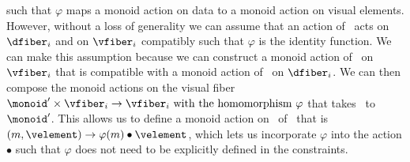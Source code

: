 \documentclass[../main.tex]{subfiles}
\begin{document}
such that \(\varphi\) maps a monoid action on data to a monoid action on visual elements. However, 
without a loss of generality we can assume that an action of \monoid\ acts on \(\dfiber_{i}\) and on \(\vfiber_{i}\) compatibly such that $\varphi$ is the identity function. We can make this assumption because we can construct a monoid action of \monoid\ on \(\vfiber_{i}\) that is compatible with a monoid action of \monoid\ on \(\dfiber_{i}\). We can then compose the monoid actions on the visual fiber \(\monoid^{\prime} \times \vfiber_{i} \rightarrow \vfiber_{i}$ with the homomorphism $\varphi\) that takes \monoid\ to \(\monoid^{\prime}\). This allows us to define a monoid action on \vfiber\ of \monoid\ that is \((m, \velement) \rightarrow \varphi(m)\bullet\velement\), which lets us incorporate \(\varphi\) into the action \(\bullet\) such that \(\varphi\) does not need to be explicitly defined in the constraints. 
\end{document}
